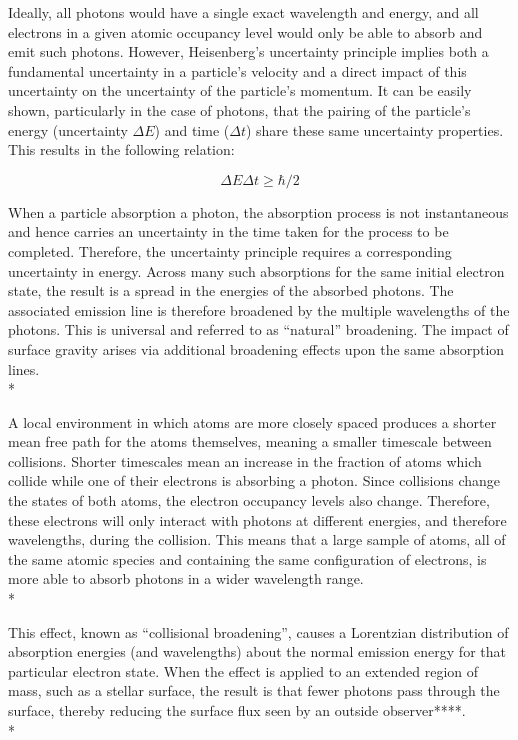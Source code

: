 \documentclass[12pt, a4paper]{report}
\begin{document}
Ideally, all photons would have a single exact wavelength and energy, and all electrons in a given atomic occupancy level would only be able to absorb and emit such photons. However, Heisenberg's uncertainty principle implies both a fundamental uncertainty in a particle's velocity and a direct impact of this uncertainty on the uncertainty of the particle's momentum. It can be easily shown, particularly in the case of photons, that the pairing of the particle's energy (uncertainty $\Delta E$) and time ($\Delta t$) share these same uncertainty properties. This results in the following relation:

\begin{equation}
\Delta E \Delta t \geq \hbar/2
\label{heisenberg}
\end{equation}

When a particle absorption a photon, the absorption process is not instantaneous and hence carries an uncertainty in the time taken for the process to be completed. Therefore, the uncertainty principle requires a corresponding uncertainty in energy. Across many such absorptions for the same initial electron state, the result is a spread in the energies of the absorbed photons. The associated emission line is therefore broadened by the multiple wavelengths of the photons. This is universal and referred to as ``natural'' broadening. The impact of surface gravity arises via additional broadening effects upon the same absorption lines. \\*

A local environment in which atoms are more closely spaced produces a shorter mean free path for the atoms themselves, meaning a smaller timescale between collisions. Shorter timescales mean an increase in the fraction of atoms which collide while one of their electrons is absorbing a photon. Since collisions change the states of both atoms, the electron occupancy levels also change. Therefore, these electrons will only interact with photons at different energies, and therefore wavelengths, during the collision. This means that a large sample of atoms, all of the same atomic species and containing the same configuration of electrons, is more able to absorb photons in a wider wavelength range. \\*

This effect, known as ``collisional broadening'', causes a Lorentzian distribution of absorption energies (and wavelengths) about the normal emission energy for that particular electron state. When the effect is applied to an extended region of mass, such as a stellar surface, the result is that fewer photons pass through the surface, thereby reducing the surface flux seen by an outside observer****.\\*
\end{document}
